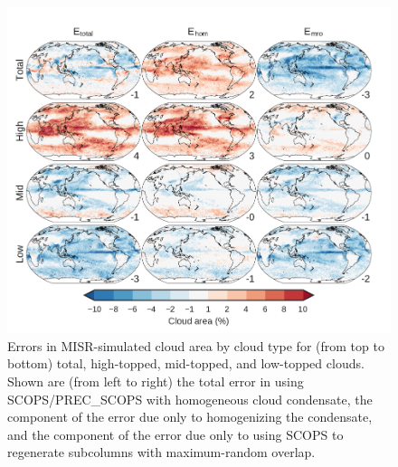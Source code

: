 \begin{figure}
\centering
\includegraphics[width=\columnwidth]{graphics/subgrid1_cldmisr_maps_diff.pdf}
\caption{Errors in MISR-simulated cloud area by cloud type for (from top to bottom) total, high-topped, mid-topped, and low-topped clouds. Shown are (from left to right) the total error in using SCOPS/PREC\_SCOPS with homogeneous cloud condensate, the component of the error due only to homogenizing the condensate, and the component of the error due only to using SCOPS to regenerate subcolumns with maximum-random overlap.}
\label{sg_cldmisr_maps_diff}
\end{figure}

